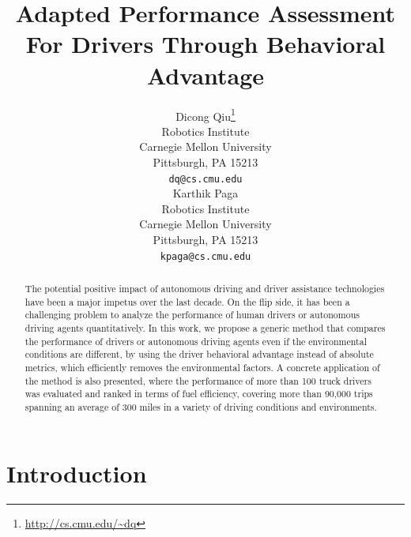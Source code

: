 \documentclass{article}
\title{Adapted Performance Assessment For Drivers Through Behavioral Advantage}
\author{
  Dicong Qiu\thanks{\url{http://cs.cmu.edu/\~dq}} \\
  Robotics Institute\\
  Carnegie Mellon University\\
  Pittsburgh, PA 15213 \\
  \texttt{dq@cs.cmu.edu} \\
  \And
  Karthik Paga\\
  Robotics Institute\\
  Carnegie Mellon University\\
  Pittsburgh, PA 15213 \\
  \texttt{kpaga@cs.cmu.edu} \\
}
\begin{document}
\maketitle

\begin{abstract}
    The potential positive impact of autonomous driving and driver assistance technologies have been a major impetus over the last decade. On the flip side, it has been a challenging problem to analyze the performance of human drivers or autonomous driving agents quantitatively. In this work, we propose a generic method that compares the performance of drivers or autonomous driving agents even if the environmental conditions are different, by using the driver behavioral advantage instead of absolute metrics, which efficiently removes the environmental factors. A concrete application of the method is also presented, where the performance of more than 100 truck drivers was evaluated and ranked in terms of fuel efficiency, covering more than 90,000 trips spanning an average of 300 miles in a variety of driving conditions and environments.
\end{abstract}



\section{Introduction}\label{sec:introduction}

\end{document}
